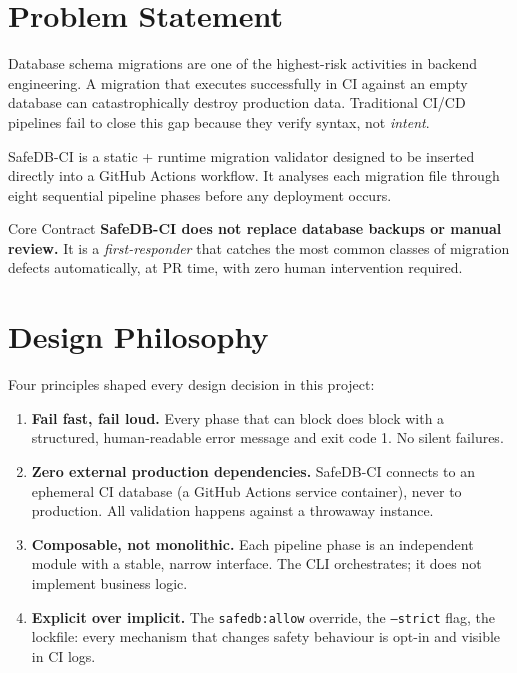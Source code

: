 \documentclass[12pt,a4paper]{report}
\begin{document}
\section{Problem Statement}

Database schema migrations are one of the highest-risk activities in backend
engineering. A migration that executes successfully in CI against an empty
database can catastrophically destroy production data. Traditional CI/CD
pipelines fail to close this gap because they verify syntax, not \emph{intent}.

SafeDB-CI is a static + runtime migration validator designed to be inserted
directly into a GitHub Actions workflow. It analyses each migration file through
eight sequential pipeline phases before any deployment occurs.

\begin{infobox}{Core Contract}
\textbf{SafeDB-CI does not replace database backups or manual review.}
It is a \emph{first-responder} that catches the most common classes of
migration defects automatically, at PR time, with zero human intervention
required.
\end{infobox}

\section{Design Philosophy}

Four principles shaped every design decision in this project:

\begin{enumerate}[leftmargin=2em]
  \item \textbf{Fail fast, fail loud.}
        Every phase that can block does block with a structured, human-readable
        error message and exit code 1. No silent failures.

  \item \textbf{Zero external production dependencies.}
        SafeDB-CI connects to an ephemeral CI database (a GitHub Actions service
        container), never to production. All validation happens against a
        throwaway instance.

  \item \textbf{Composable, not monolithic.}
        Each pipeline phase is an independent module with a stable, narrow interface.
        The CLI orchestrates; it does not implement business logic.

  \item \textbf{Explicit over implicit.}
        The \texttt{safedb:allow} override, the \texttt{--strict} flag, the lockfile:
        every mechanism that changes safety behaviour is opt-in and visible in CI logs.
\end{enumerate}
\end{document}
